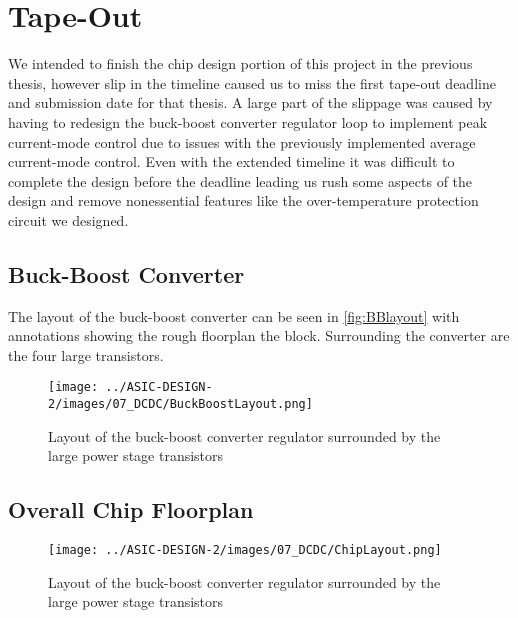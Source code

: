 \section{Tape-Out}
\label{sec:tapout}

We intended to finish the chip design portion of this project in the previous thesis, however slip in the timeline caused us to miss the first tape-out deadline and submission date for that thesis. A large part of the slippage was caused by having to redesign the buck-boost converter regulator loop to implement peak current-mode control due to issues with the previously implemented average current-mode control. Even with the extended timeline it was difficult to complete the design before the deadline leading us rush some aspects of the design and remove nonessential features like the over-temperature protection circuit we designed.

\subsection{Buck-Boost Converter}
The layout of the buck-boost converter can be seen in  \autoref{fig:BBlayout} with annotations showing the rough floorplan the block. Surrounding the converter are the four large transistors.


\begin{figure}[h]
    \centering
    \texttt{[image: ../ASIC-DESIGN-2/images/07\_DCDC/BuckBoostLayout.png]}
    \caption{Layout of the buck-boost converter regulator surrounded by the large power stage transistors}
    \label{fig:BBlayout}
\end{figure}

\subsection{Overall Chip Floorplan}
\begin{figure}[h]
    \centering
    \texttt{[image: ../ASIC-DESIGN-2/images/07\_DCDC/ChipLayout.png]}
    \caption{Layout of the buck-boost converter regulator surrounded by the large power stage transistors}
    \label{fig:chiplayout}
\end{figure}

